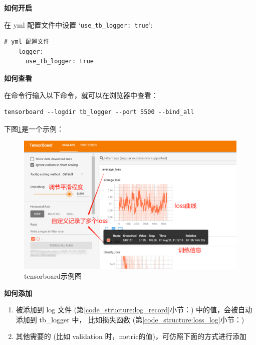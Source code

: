 \documentclass[../main.tex]{subfiles}
\begin{document}
\textbf{如何开启}

在 yml 配置文件中设置 `\texttt{use\_tb\_logger: true}':
\begin{verbatim}
# yml 配置文件
    logger:
      use_tb_logger: true
\end{verbatim}

\textbf{如何查看}

在命令行输入以下命令，就可以在浏览器中查看：
\begin{verbatim}
tensorboard --logdir tb_logger --port 5500 --bind_all
\end{verbatim}

下图\ref{fig:tensorboard_demo}是一个示例：
\begin{figure}[h]
    \begin{center}
        \includegraphics[width=0.8\linewidth]{figures/code_structure_tensorboard.png}
        \caption{tensorboard示例图}
        \label{fig:tensorboard_demo}
    \end{center}
\end{figure}

\textbf{如何添加}

\begin{enumerate}
    \item 被添加到 log 文件 (第\ref{code_structure:log_record}小节：) 中的值，会被自动添加到 tb\_logger 中， 比如损失函数 (第\ref{code_structure:loss_log}小节：)
    \item 其他需要的 (比如 validation 时，metric的值)，可仿照下面的方式进行添加
\end{enumerate}
\end{document}

